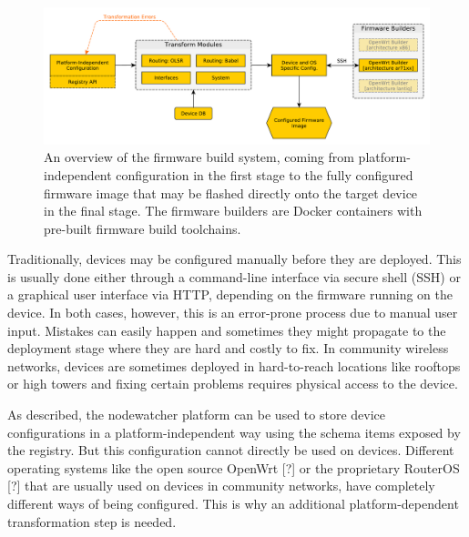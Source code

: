 \documentclass[5p,sort&compress]{elsarticle}
\begin{document}
\begin{figure}
  \centering
  \includegraphics[scale=0.5]{figures/firmware-buildsystem.pdf}
  \caption{An overview of the firmware build system, coming from platform-independent configuration in the first stage to the fully configured firmware image that may be flashed directly onto the target device in the final stage.
The firmware builders are Docker containers with pre-built firmware build toolchains.}
  \label{fig:firmware-build-system}
\end{figure}

Traditionally, devices may be configured manually before they are deployed.
This is usually done either through a command-line interface via secure shell (SSH) or a graphical user interface via HTTP, depending on the firmware running on the device.
In both cases, however, this is an error-prone process due to manual user input.
Mistakes can easily happen and sometimes they might propagate to the deployment stage where they are hard and costly to fix.
In community wireless networks, devices are sometimes deployed in hard-to-reach locations like rooftops or high towers and fixing certain problems requires physical access to the device.

As described, the nodewatcher platform can be used to store device configurations in a platform-independent way using the schema items exposed by the registry.
But this configuration cannot directly be used on devices.
Different operating systems like the open source OpenWrt [?] or the proprietary RouterOS [?] that are usually used on devices in community networks, have completely different ways of being configured.
This is why an additional platform-dependent transformation step is needed.
\end{document}
